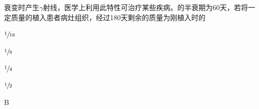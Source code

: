 衰变时产生\(\gamma\)射线，医学上利用此特性可治疗某些疾病。的半衰期为60天，若将一定质量的植入患者病灶组织，经过180天剩余的质量为刚植入时的\paren[]
\begin{choices}
	\item \(\sfrac{1}{16}\)
	\item \(\sfrac{1}{8}\)
	\item \(\sfrac{1}{4}\)
	\item \(\sfrac{1}{2}\)
\end{choices}
\begin{answer}
	B
\end{answer}